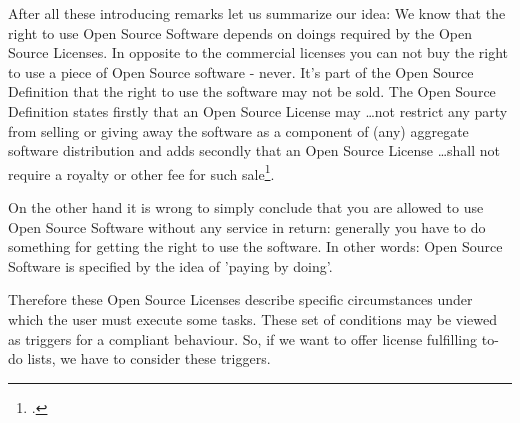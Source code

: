 %
%
%
%
%



After all these introducing remarks let us summarize our idea: We know that the
right to use Open Source Software depends on doings required by the Open Source
Licenses. In opposite to the commercial licenses you can not buy the right to
use a piece of Open Source software - never. It's part of the Open Source
Definition that the right to use the software may not be sold. The Open Source
Definition states firstly that an Open Source License may \glqq{}\ldots not
restrict any party from selling or giving away the software as a component of (any)
aggregate software distribution\grqq{} and adds secondly that an Open Source
License \glqq{}\ldots shall not require a royalty or other fee for such
sale\grqq{}\footcite[cf.][\nopage wp. §1]{OSI2012a}.

On the other hand it is wrong to simply conclude that you are allowed to use
Open Source Software without any service in return: generally you have to do
something for getting the right to use the software. In other words: Open Source
Software is specified by the idea of 'paying by doing'.

Therefore these Open Source Licenses describe specific circumstances under
which the user must execute some tasks. These set of conditions may be viewed as
triggers for a compliant behaviour. So, if we want to offer license fulfilling
to-do lists, we have to consider these triggers. 

